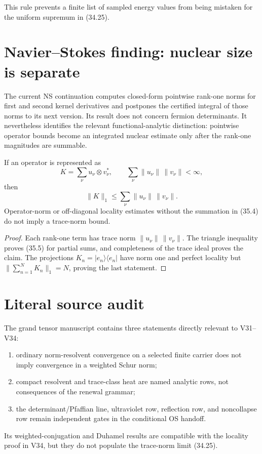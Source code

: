 \documentclass[11pt]{article}
\theoremstyle{remark}
\begin{document}
This rule prevents a finite list of sampled energy values from being
mistaken for the uniform supremum in (34.25).

\section{Navier--Stokes finding: nuclear size is separate}

The current NS continuation computes closed-form pointwise rank-one
norms for first and second kernel derivatives and postpones the
certified integral of those norms to its next version.  Its result
does not concern fermion determinants.  It nevertheless identifies
the relevant functional-analytic distinction: pointwise operator
bounds become an integrated nuclear estimate only after the
rank-one magnitudes are summable.

\begin{principle}
\label{prin:v15v35-nuclear}
If an operator is represented as
\[
 K=\sum_{\nu}u_\nu\otimes v_\nu^*,
 \qquad
 \sum_\nu\|u_\nu\|\,\|v_\nu\|<\infty,                    \tag{35.4}
\]
then
\[
 \|K\|_1\leq\sum_\nu\|u_\nu\|\,\|v_\nu\|.                \tag{35.5}
\]
Operator-norm or off-diagonal locality estimates without the
summation in (35.4) do not imply a trace-norm bound.
\end{principle}

\begin{proof}
Each rank-one term has trace norm
\(\|u_\nu\|\,\|v_\nu\|\).  The triangle inequality proves (35.5)
for partial sums, and completeness of the trace ideal proves the
claim.  The projections
\(K_n=|e_n\rangle\langle e_n|\) have norm one and perfect
locality but \(\|\sum_{n=1}^NK_n\|_1=N\), proving the last
statement.
\end{proof}

\section{Literal source audit}

The grand tensor manuscript contains three statements directly
relevant to V31--V34:
\begin{enumerate}
\item ordinary norm-resolvent convergence on a selected finite
      carrier does not imply convergence in a weighted Schur norm;
\item compact resolvent and trace-class heat are named analytic
      rows, not consequences of the renewal grammar;
\item the determinant/Pfaffian line, ultraviolet row, reflection
      row, and noncollapse row remain independent gates in the
      conditional OS handoff.
\end{enumerate}
Its weighted-conjugation and Duhamel results are compatible with
the locality proof in V34, but they do not populate the
trace-norm limit (34.25).
\end{document}
